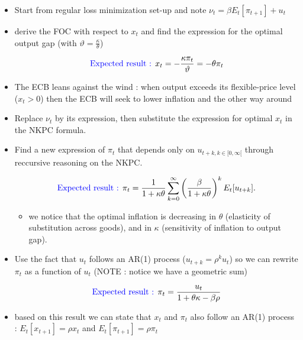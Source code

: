 \documentclass{article}
\begin{document}
\begin{itemize}
    \item Start from regular loss minimization set-up and note $\nu_t=\beta E_t[\pi_{t+1}]+u_t$
    \item derive the FOC with respect to $x_t$ and find the expression for the optimal output gap (with $\vartheta=\frac{\kappa}{\theta}$)
    \begin{expectedresultsbox}
    \begin{equation}
        \text{\textcolor{blue}{Expected result : }} x_t = -\frac{\kappa\pi_t}{\vartheta} = -\theta\pi_t
    \end{equation}
    \end{expectedresultsbox}
    \item The ECB leans against the wind : when output exceeds its flexible-price level ($x_t>0$) then the ECB will seek to lower inflation and the other way around
    \item Replace $\nu_t$ by its expression, then substitute the expression for optimal $x_t$ in the NKPC formula. 
    \item Find a new expression of $\pi_t$ that depends only on $u_{t+k,k\in[0,\infty[}$ through reccursive reasoning on the NKPC.
   \begin{expectedresultsbox}
       \begin{equation}
       \text{\textcolor{blue}{Expected result : }} \pi_t = \frac{1}{1+\kappa\theta}\sum_{k=0}^{\infty}\left( \frac{\beta}{1+\kappa\theta}\right) ^kE_t[u_{t+k}]. 
    \end{equation}
    \begin{itemize}
        \item we notice that the optimal inflation is decreasing in $\theta$ (elasticity of substitution across goods), and in $\kappa$ (sensitivity of inflation to output gap).
    \end{itemize}
   \end{expectedresultsbox}
    \item Use the fact that $u_t$ follows an AR(1) process ($u_{t+k}=\rho^ku_t$) so we can rewrite $\pi_t$ as a function of $u_t$ (NOTE : notice we have a geometric sum)
    \begin{expectedresultsbox}
    \begin{equation}
       \text{\textcolor{blue}{Expected result : }} \pi_t = \frac{u_t}{1+\theta\kappa-\beta\rho}
    \end{equation}  
    \end{expectedresultsbox}
    \item based on this result we can state that $x_t$ and $\pi_t$ also follow an AR(1) process : $E_t[x_{t+1}] = \rho x_t$ and $E_t[\pi_{t+1}] = \rho \pi_t$

\end{itemize}
\end{document}

